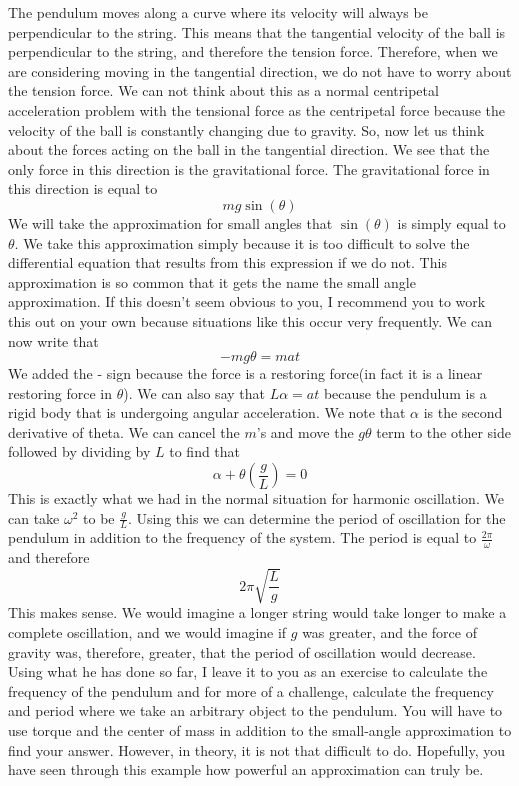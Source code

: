 \documentclass{article}[gray]
\numberwithin{equation}{subsection}
\begin{document}
The pendulum moves along a curve where its velocity will always be perpendicular to the string. This means that the tangential velocity of the ball is perpendicular to the string, and therefore the tension force. Therefore, when we are considering moving in the tangential direction, we do not have to worry about the tension force. We can not think about this as a normal centripetal acceleration problem with the tensional force as the centripetal force because the velocity of the ball is constantly changing due to gravity. So, now let us think about the forces acting on the ball in the tangential direction. We see that the only force in this direction is the gravitational force. The gravitational force in this direction is equal to $$mg\sin\left(\theta \right)$$ We will take the approximation for small angles that $\sin\left(\theta \right)$ is simply equal to $\theta$. We take this approximation simply because it is too difficult to solve the differential equation that results from this expression if we do not. This approximation is so common that it gets the name the small angle approximation. If this doesn't seem obvious to you, I recommend you to work this out on your own because situations like this occur very frequently. We can now write that $$-mg\theta=mat$$ We added the - sign because the force is a restoring force(in fact it is a linear restoring force in $\theta$). We can also say that $L\alpha=at$ because the pendulum is a rigid body that is undergoing angular acceleration. We note that $\alpha$ is the second derivative of theta. We can cancel the $m$’s and move the $g\theta$ term to the other side followed by dividing by $L$ to find that \begin{equation}\alpha+\theta \left(\frac{g}{L}\right) =0\end{equation} This is exactly what we had in the normal situation for harmonic oscillation. We can take $\omega^2$ to be $\frac{g}{L}$. Using this we can determine the period of oscillation for the pendulum in addition to the frequency of the system. The period is equal to $\frac{2\pi}{\omega}$ and therefore $$2\pi \sqrt{\frac{L}{g}}$$ This makes sense. We would imagine a longer string would take longer to make a complete oscillation, and we would imagine if $g$ was greater, and the force of gravity was, therefore, greater, that the period of oscillation would decrease. Using what he has done so far, I leave it to you as an exercise to calculate the frequency of the pendulum and for more of a challenge, calculate the frequency and period where we take an arbitrary object to the pendulum. You will have to use torque and the center of mass in addition to the small-angle approximation to find your answer. However, in theory, it is not that difficult to do. Hopefully, you have seen through this example how powerful an approximation can truly be. 
\pagebreak
\end{document}
